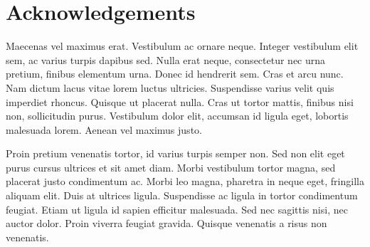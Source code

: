 \documentclass[a4paper,12pt,stu,donotrepeattitle,floatsintext,twoside]{apa7}
\begin{document}
\newpage

\section*{Acknowledgements}

Maecenas vel maximus erat. Vestibulum ac ornare neque. Integer vestibulum elit sem, ac varius turpis dapibus sed. Nulla erat neque, consectetur nec urna pretium, finibus elementum urna. Donec id hendrerit sem. Cras et arcu nunc. Nam dictum lacus vitae lorem luctus ultricies. Suspendisse varius velit quis imperdiet rhoncus. Quisque ut placerat nulla. Cras ut tortor mattis, finibus nisi non, sollicitudin purus. Vestibulum dolor elit, accumsan id ligula eget, lobortis malesuada lorem. Aenean vel maximus justo.

Proin pretium venenatis tortor, id varius turpis semper non. Sed non elit eget purus cursus ultrices et sit amet diam. Morbi vestibulum tortor magna, sed placerat justo condimentum ac. Morbi leo magna, pharetra in neque eget, fringilla aliquam elit. Duis at ultrices ligula. Suspendisse ac ligula in tortor condimentum feugiat. Etiam ut ligula id sapien efficitur malesuada. Sed nec sagittis nisi, nec auctor dolor. Proin viverra feugiat gravida. Quisque venenatis a risus non venenatis.

\cleardoublepage



\section{\titlet}
\vspace{0.5\baselineskip}   %
\end{document}
